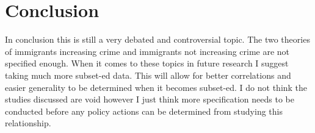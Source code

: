 \documentclass[12pt,letterpaper]{article}
\begin{document}
\section{Conclusion}
        \indent In conclusion this is still a very debated and controversial topic. The two theories of immigrants increasing crime and immigrants not increasing crime are not specified enough. When it comes to these topics in future research I suggest taking much more subset-ed data. This will allow for better correlations and easier generality to be determined when it becomes subset-ed. I do not think the studies discussed are void however I just think more specification needs to be conducted before any policy actions can be determined from studying this relationship.
\newpage


\citep{M_P}
\citep{L_J_J}
\citep{C_Aaron}
\citep{B_Scott}
\citep{O_G}
\end{document}
